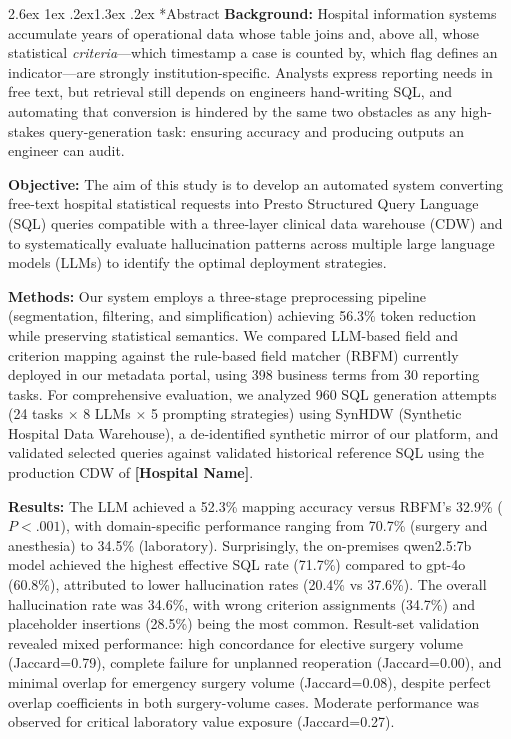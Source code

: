 \documentclass[10pt,twocolumn]{article}
\makeatletter
\renewcommand\section{\@startsection{section}{1}{\z@}%
  {2.6ex \@plus 1ex \@minus .2ex}{1.3ex \@plus .2ex}%
  {\normalfont\large\bfseries}}
\newcommand{\PH}[1]{{\color{red}\textbf{[#1]}}}
\makeatother
\begin{document}
\section*{Abstract}
\noindent\textbf{Background:} Hospital information systems accumulate years of
operational data whose table joins and, above all, whose statistical
\emph{criteria}---which timestamp a case is counted by, which flag defines an
indicator---are strongly institution-specific. Analysts express reporting needs in
free text, but retrieval still depends on engineers hand-writing SQL, and
automating that conversion is hindered by the same two obstacles as any
high-stakes query-generation task: ensuring accuracy and producing outputs an
engineer can audit.

\noindent\textbf{Objective:} The aim of this study is to develop an automated system converting free-text hospital statistical requests into Presto Structured Query Language (SQL) queries compatible with a three-layer clinical data warehouse (CDW) and to
systematically evaluate hallucination patterns across multiple large language
models (LLMs) to identify the optimal deployment strategies.

\noindent\textbf{Methods:} Our system employs a three-stage preprocessing
pipeline (segmentation, filtering, and simplification) achieving 56.3\% token
reduction while preserving statistical semantics. We compared LLM-based field
and criterion mapping against the rule-based field matcher (RBFM) currently
deployed in our metadata portal, using 398 business terms from 30 reporting
tasks. For comprehensive evaluation, we analyzed 960 SQL generation attempts
(24 tasks $\times$ 8 LLMs $\times$ 5 prompting strategies) using SynHDW
(Synthetic Hospital Data Warehouse), a de-identified synthetic mirror of our
platform, and validated selected queries against validated historical reference
SQL using the production CDW of \PH{Hospital Name}.

\noindent\textbf{Results:} The LLM achieved a 52.3\% mapping accuracy versus
RBFM's 32.9\% ($P<.001$), with domain-specific performance ranging from 70.7\%
(surgery and anesthesia) to 34.5\% (laboratory). Surprisingly, the on-premises
qwen2.5:7b model achieved the highest effective SQL rate (71.7\%) compared to
gpt-4o (60.8\%), attributed to lower hallucination rates (20.4\% vs 37.6\%).
The overall hallucination rate was 34.6\%, with wrong criterion assignments
(34.7\%) and placeholder insertions (28.5\%) being the most common. Result-set
validation revealed mixed performance: high concordance for elective surgery
volume (Jaccard=0.79), complete failure for unplanned reoperation
(Jaccard=0.00), and minimal overlap for emergency surgery volume (Jaccard=0.08),
despite perfect overlap coefficients in both surgery-volume cases. Moderate
performance was observed for critical laboratory value exposure (Jaccard=0.27).
\end{document}
